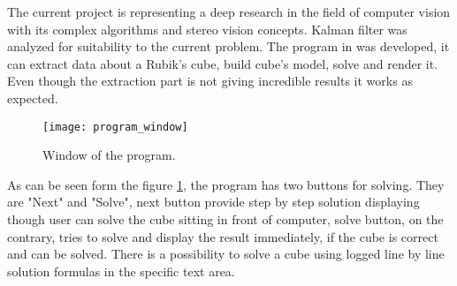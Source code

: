 \documentclass[../main.tex]{subfiles}
\begin{document}
The current project is representing a deep research in the field of computer vision with its complex algorithms and stereo vision concepts. Kalman filter was analyzed for suitability to the current problem. The program in {\Csharp} was developed, it can extract data about a Rubik's cube, build cube's model, solve and render it. Even though the extraction part is not giving incredible results it works as expected.

\begin{figure} [ht!]
    \begin{center}
        \texttt{[image: program\_window]}
        \caption{Window of the program.}
        \label{fig:framework_program_window}
    \end{center}
\end{figure}

As can be seen form the figure \ref{fig:framework_program_window}, the program has two buttons for solving. They are "Next" and "Solve", next button provide step by step solution displaying though user can solve the cube sitting in front of computer, solve button, on the contrary, tries to solve and display the result immediately, if the cube is correct and can be solved. There is a possibility to solve a cube using logged line by line solution formulas in the specific text area.
\end{document}
